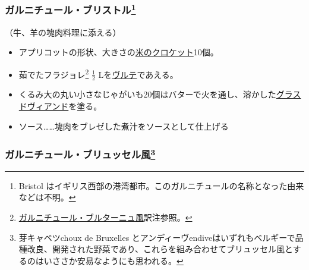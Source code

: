 \begin{recette}
\hypertarget{garniture-bristol}{%
\subsubsection[ガルニチュール・ブリストル]{\texorpdfstring{ガルニチュール・ブリストル\footnote{Bristol
  はイギリス西部の港湾都市。このガルニチュールの名称となった由来などは不明。}}{ガルニチュール・ブリストル}}\label{garniture-bristol}}



（牛、羊の塊肉料理に添える）

\begin{itemize}
\item
  アプリコットの形状、大きさの\protect\hyperlink{croquette-de-riz}{米のクロケット}10個。
\item
  茹でたフラジョレ\footnote{\protect\hyperlink{garniture-bretonne}{ガルニチュール・ブルターニュ風}訳注参照。}
  \(\frac{1}{2}\) Lを\protect\hyperlink{veloute}{ヴルテ}であえる。
\item
  くるみ大の丸い小さなじゃがいも20個はバターで火を通し、溶かした\protect\hyperlink{glace-de-viande}{グラスドヴィアンド}を塗る。
\item
  ソース\ldots{}\ldots{}塊肉をブレゼした煮汁をソースとして仕上げる
\end{itemize}

\hypertarget{garniture-bluxelloise}{%
\subsubsection[ガルニチュール・ブリュッセル風]{\texorpdfstring{ガルニチュール・ブリュッセル風\footnote{芽キャベツchoux
  de Bruxelles
  とアンディーヴendiveはいずれもベルギーで品種改良、開発された野菜であり、これらを組み合わせてブリュッセル風とするのはいささか安易なようにも思われる。}}{ガルニチュール・ブリュッセル風}}\label{garniture-bluxelloise}}




\end{recette}
